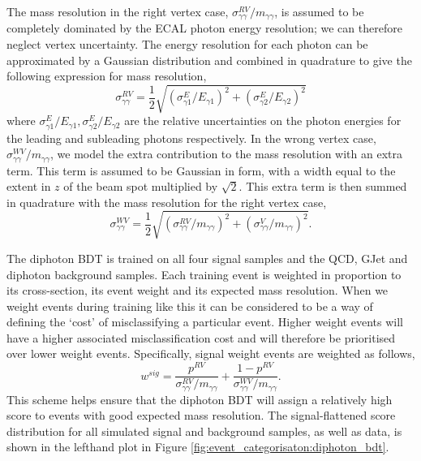 The mass resolution in the right vertex case, $\sigma^{RV}_{\gamma\gamma}/m_{\gamma\gamma}$, is assumed to be completely dominated by the ECAL photon energy resolution; we can therefore neglect vertex uncertainty. The energy resolution for each photon can be approximated by a Gaussian distribution and combined in quadrature to give the following expression for mass resolution,
\begin{equation}
    \sigma^{RV}_{\gamma\gamma} = \frac{1}{2}\sqrt{(\sigma^{E}_{\gamma{1}}/E_{\gamma{1}})^2 + (\sigma^{E}_{\gamma{2}}/E_{\gamma{2}})^2}
\end{equation} 
where $\sigma^{E}_{\gamma{1}}/E_{\gamma{1}}, \sigma^{E}_{\gamma{2}}/E_{\gamma{2}}$ are the relative uncertainties on the photon energies for the leading and subleading photons respectively. 
In the wrong vertex case, $\sigma^{WV}_{\gamma\gamma}/m_{\gamma\gamma}$, we model the extra contribution to the mass resolution with an extra term. This term is assumed to be Gaussian in form, with a width equal to the extent in $z$ of the beam spot multiplied by $\sqrt{2}$. This extra term is then summed in quadrature with the mass resolution for the right vertex case,
\begin{equation}
    \sigma^{WV}_{\gamma\gamma} = \frac{1}{2}\sqrt{(\sigma^{RV}_{\gamma\gamma}/m_{\gamma\gamma})^2 + (\sigma^{V}_{\gamma\gamma}/m_{\gamma\gamma})^2}.
\end{equation} 


The diphoton BDT is trained on all four signal samples and the QCD, GJet and diphoton background samples. 
Each training event is weighted in proportion to its cross-section, its event weight and its expected mass resolution. 
When we weight events during training like this it can be considered to be a way of defining the `cost' of misclassifying a particular event. Higher weight events will have a higher associated misclassification cost and will therefore be prioritised over lower weight events. 
Specifically, signal weight events are weighted as follows,
\begin{equation}
    w^{sig} = \frac{p^{RV}}{\sigma^{RV}_{\gamma\gamma}/m_{\gamma\gamma}} + \frac{1-p^{RV}}{\sigma^{WV}_{\gamma\gamma}/m_{\gamma\gamma}}.
\end{equation}
This scheme helps ensure that the diphoton BDT will assign a relatively high score to events with good expected mass resolution. 
The signal-flattened score distribution for all simulated signal and background samples, as well as data, is shown in the lefthand plot in Figure \ref{fig:event_categorisaton:diphoton_bdt}. 


